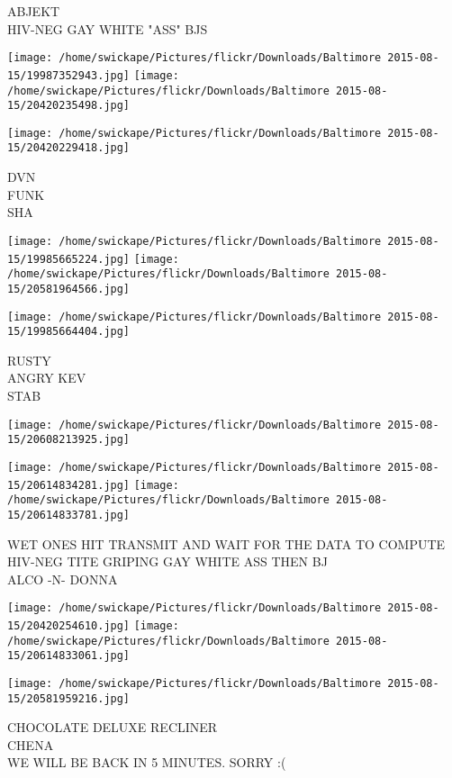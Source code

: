 \documentclass[10pt,letterpaper]{article}
\begin{document}
ABJEKT\\
HIV{-}NEG GAY WHITE "ASS" BJS
\pagebreak

\texttt{[image: /home/swickape/Pictures/flickr/Downloads/Baltimore 2015-08-15/19987352943.jpg]}
\texttt{[image: /home/swickape/Pictures/flickr/Downloads/Baltimore 2015-08-15/20420235498.jpg]}

\vspace{0.25in}
\texttt{[image: /home/swickape/Pictures/flickr/Downloads/Baltimore 2015-08-15/20420229418.jpg]}

DVN\\
FUNK\\
SHA
\pagebreak

\texttt{[image: /home/swickape/Pictures/flickr/Downloads/Baltimore 2015-08-15/19985665224.jpg]}
\texttt{[image: /home/swickape/Pictures/flickr/Downloads/Baltimore 2015-08-15/20581964566.jpg]}

\texttt{[image: /home/swickape/Pictures/flickr/Downloads/Baltimore 2015-08-15/19985664404.jpg]}

RUSTY\\
ANGRY KEV\\
STAB
\pagebreak

\texttt{[image: /home/swickape/Pictures/flickr/Downloads/Baltimore 2015-08-15/20608213925.jpg]}

\vspace{0.25in}
\texttt{[image: /home/swickape/Pictures/flickr/Downloads/Baltimore 2015-08-15/20614834281.jpg]}
\texttt{[image: /home/swickape/Pictures/flickr/Downloads/Baltimore 2015-08-15/20614833781.jpg]}

WET ONES HIT TRANSMIT AND WAIT FOR THE DATA TO COMPUTE\\
HIV{-}NEG TITE GRIPING GAY WHITE ASS THEN BJ\\
ALCO {-}N{-} DONNA
\pagebreak

\texttt{[image: /home/swickape/Pictures/flickr/Downloads/Baltimore 2015-08-15/20420254610.jpg]}
\texttt{[image: /home/swickape/Pictures/flickr/Downloads/Baltimore 2015-08-15/20614833061.jpg]}

\texttt{[image: /home/swickape/Pictures/flickr/Downloads/Baltimore 2015-08-15/20581959216.jpg]}

CHOCOLATE DELUXE RECLINER\\
CHENA\\
WE WILL BE BACK IN 5 MINUTES.  SORRY :(
\pagebreak
\end{document}
